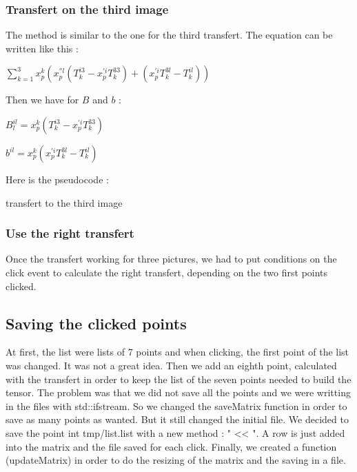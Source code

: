 \documentclass{report}
\begin{document}
\subsubsection{Transfert on the third image}
The method is similar to the one for the third transfert.
The equation can be written like this : 

\begin{center}
 $ \displaystyle { \sum_{k = 1}^{3}} x_{p}^{k}(x_{p}^{''l}(T_{k}^{i3} - x_{p}^{'i}T_{k}^{33}) + ( x_{p}^{'i}T_{k}^{3l} - T_{k}^{il}))$ 
\end{center}

Then we have for $B$ and $b$ :  
\begin{center}
$B_{l}^{il} = x_{p}^{k}(T_{k}^{i3} - x_{p}^{'i}T_{k}^{33})$
\end{center}
\begin{center}
$b^{il} = x_{p}^{k}(x_{p}^{'i}T_{k}^{3l} - T_{k}^{il})$
\end{center}

Here is the pseudocode : 
\begin{algorithm}
\SetLine
\caption{transfert to the third image}
\SetLine
{}
\end{algorithm}
\subsubsection{Use the right transfert}
Once the transfert working for three pictures, we had to put conditions on the click event to calculate the right transfert, depending on the two first points clicked.  

 
\subsection{Saving the clicked points}
At first, the list were lists of 7 points and when clicking, the first point of the list was changed. It was not a great idea. 
Then we add an eighth point, calculated with the transfert in order to keep the list of the seven points needed to build the tensor. The problem was that we did not save all the points and we were writting in the files with std::ifstream. So we changed the saveMatrix function in order to save as many points as wanted. But it still changed the initial file. 
We decided to save the point int tmp/list.list with a new method : " << ". A row is just added into the matrix and the file saved for each click. 
Finally, we created a function (updateMatrix) in order to do the resizing of the matrix and the saving in a file. 
\end{document}

